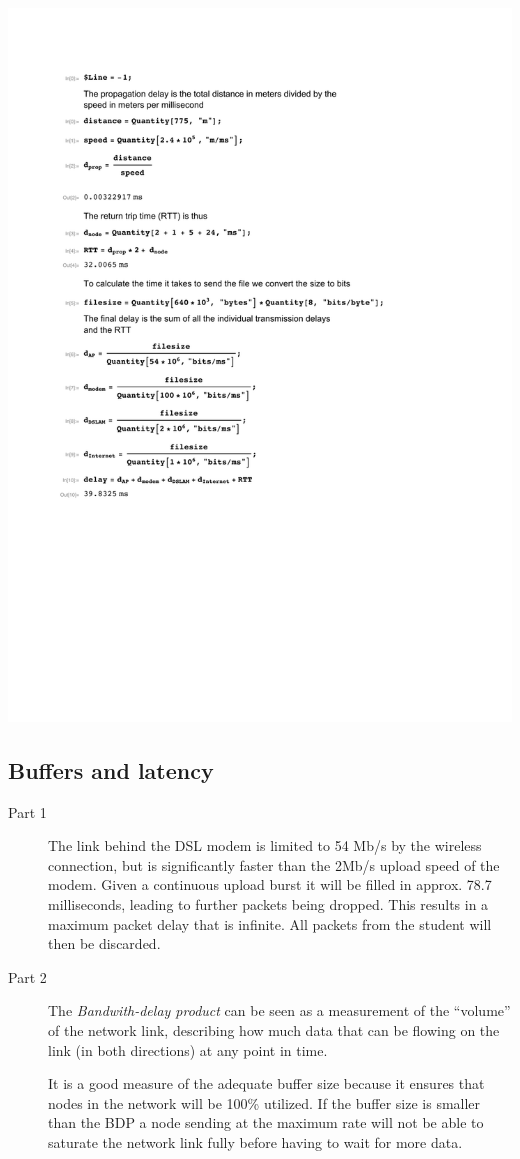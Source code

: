 \documentclass[a4paper]{article}
\begin{document}
\includegraphics{../calc2.pdf}

\subsection{Buffers and latency}
\begin{description}
    \item[Part 1] The link behind the DSL modem is limited to 54 Mb/s by the
        wireless connection, but is significantly faster than the 2Mb/s upload
        speed of the modem. Given a continuous upload burst it will be filled
        in approx. 78.7 milliseconds, leading to further packets being dropped.
        This results in a maximum packet delay that is infinite. All packets
        from the student will then be discarded.
    \item[Part 2] The \emph{Bandwith-delay product} can be seen as a
        measurement of the ``volume'' of the network link, describing how much
        data that can be flowing on the link (in both directions) at any point in time.
        
        It is a good measure of the adequate buffer size because it ensures that nodes
        in the network will be 100\% utilized. If the buffer size is smaller than the
        BDP a node sending at the maximum rate will not be able to saturate the network
        link fully before having to wait for more data.
\end{description}
\end{document}
